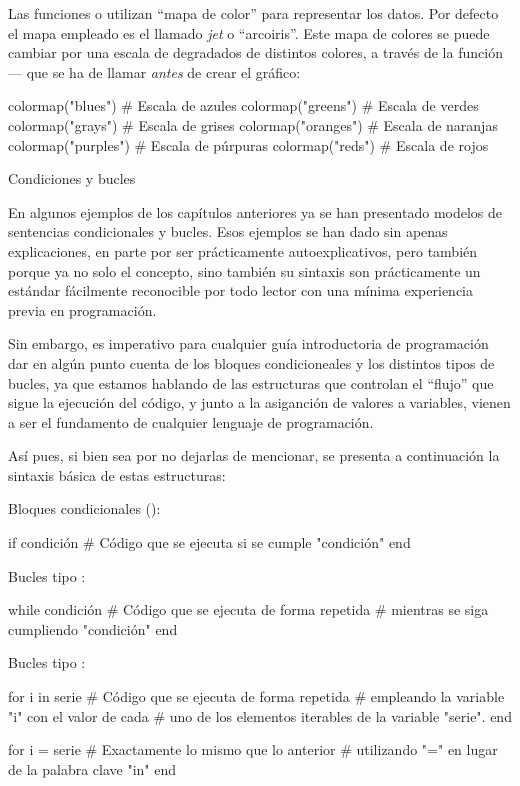 ﻿\documentclass[spanish]{article}
\begin{document}
Las funciones  o  utilizan ``mapa de color''
para representar los datos. Por defecto el mapa empleado es el llamado
\emph{jet} o ``arcoiris''. Este mapa de colores se puede cambiar por una
escala de degradados de distintos colores, a través de la función
 --- que se ha de llamar \emph{antes} de crear el gráfico:

colormap("blues")   # Escala de azules
colormap("greens")  # Escala de verdes
colormap("grays")   # Escala de grises
colormap("oranges") # Escala de naranjas
colormap("purples") # Escala de púrpuras
colormap("reds")    # Escala de rojos


Condiciones y bucles

En algunos ejemplos de los capítulos anteriores ya se han presentado modelos
de sentencias condicionales y bucles. Esos ejemplos se han dado sin apenas
explicaciones, en parte por ser prácticamente autoexplicativos, pero también
porque ya no solo el concepto, sino también su sintaxis
son prácticamente un estándar fácilmente reconocible por todo lector con
una mínima experiencia previa en programación.

Sin embargo, es imperativo para cualquier guía introductoria de programación
dar en algún punto cuenta de los bloques condicioneales y los distintos tipos de bucles, ya que
estamos hablando de las estructuras que controlan el ``flujo'' que sigue la
ejecución del código, y junto a la asiganción de
valores a variables, vienen a ser el fundamento de cualquier lenguaje de programación.

Así pues, si bien sea por no dejarlas de mencionar, se presenta a continuación la sintaxis
básica de estas estructuras:

Bloques condicionales ():

if condición
  # Código que se ejecuta si se cumple "condición"
end

Bucles tipo :

while condición
  # Código que se ejecuta de forma repetida
  # mientras se siga cumpliendo "condición"
end

Bucles tipo :

for i in serie
  # Código que se ejecuta de forma repetida
  # empleando la variable "i" con el valor de cada
  # uno de los elementos iterables de la variable "serie".
end

for i = serie
  # Exactamente lo mismo que lo anterior
  # utilizando "=" en lugar de la palabra clave "in"
end
\end{document}

